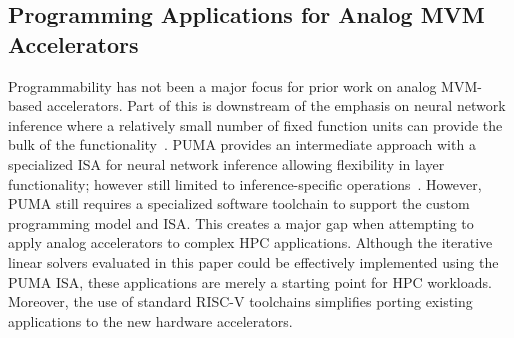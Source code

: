 
\subsection{Programming Applications for Analog MVM Accelerators}
Programmability has not been a major focus for prior work on analog MVM-based accelerators.
Part of this is downstream of the emphasis on neural network inference where a relatively small number of fixed function units can provide the bulk of the functionality~\cite{9669117}.
PUMA provides an intermediate approach with a specialized ISA for neural network inference allowing flexibility in layer functionality; however still limited to inference-specific operations~\cite{10.1145/3297858.3304049}.
However, PUMA still requires a specialized software toolchain to support the custom programming model and ISA.
This creates a major gap when attempting to apply analog accelerators to complex HPC applications.
Although the iterative linear solvers evaluated in this paper could be effectively implemented using the PUMA ISA, these applications are merely a starting point for HPC workloads.
Moreover, the use of standard RISC-V toolchains simplifies porting existing applications to the new hardware accelerators.








